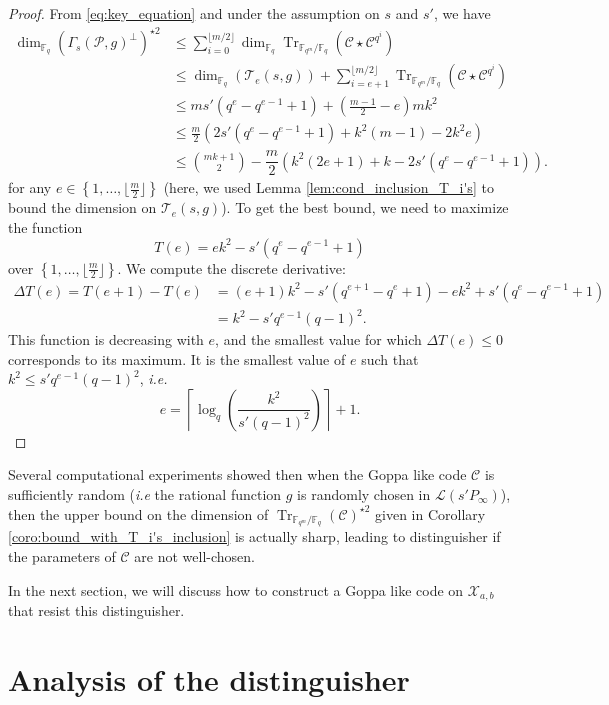 \documentclass[a4paper]{article}
\theoremstyle{definition}
\theoremstyle{remark}
\newcommand{\calP}{\mathcal{P}}
\newcommand{\calL}{\mathcal{L}}
\newcommand{\calC}{\mathcal{C}}
\newcommand{\calT}{\mathcal{T}}
\newcommand{\calX}{\mathcal{X}}
\newcommand{\fq}{\mathbb{F}_{q}}
\newcommand{\Tr}[1]{\operatorname{Tr}_{\mathbb{F}_{q^m}/\fq}\left(#1\right)}
\newcommand{\set}[1]{\left\{#1\right\}}
\begin{document}
\begin{proof}
    From \eqref{eq:key_equation} and under the assumption on $s$ and $s'$, we have
        \begin{align*}
        \dim_{\fq} (\Gamma_s(\calP,g)^{\perp})^{\star 2}
        & \leq \sum\limits_{i=0}^{\lfloor m/2 \rfloor} \dim_{\fq} \Tr{\calC \star \calC^{q^i}} \\
        & \leq \dim_{\fq} (\calT_e(s,g)) + \sum\limits_{i=e+1}^{\lfloor m/2 \rfloor} \Tr{\calC \star \calC^{q^i}} \\
        & \leq ms'(q^e-q^{e-1}+1) + \left( \frac{m-1}{2} -e \right)mk^2 \\
        & \leq \frac{m}{2}\left(2s'(q^e-q^{e-1}+1)+k^2(m-1)-2k^2e  \right) \\
        & \leq \binom{mk+1}{2} -  \dfrac{m}{2}\left(k^2(2e+1)+k-2s'(q^e-q^{e-1}+1)\right).
    \end{align*}
for any $e \in \set{1,\dots,\lfloor \frac{m}{2} \rfloor}$ (here, we used Lemma \ref{lem:cond_inclusion_T_i's} to bound the dimension on $\calT_e(s,g)$).
To get the best bound, we need to maximize the function
$$T(e) = ek^2-s'(q^e-q^{e-1}+1)$$
over $\set{1,\dots,\lfloor \frac{m}{2} \rfloor}$.
We compute the discrete derivative:
\begin{align*}
    \Delta T(e) = T(e+1)-T(e) &= (e+1)k^2- s'(q^{e+1}-q^e+1) - ek^2 + s'(q^e-q^{e-1}+1) \\
                              &= k^2 - s'q^{e-1}(q-1)^2.
\end{align*}
This function is decreasing with $e$, and the smallest value for which $\Delta T(e) \leq 0$ corresponds to its maximum. It is the smallest value of $e$ such that $k^2 \leq s'q^{e-1}(q-1)^2$, \emph{i.e.}
$$e =  \left\lceil \log_q\left(\dfrac{k^2}{s'(q-1)^2}\right)\right\rceil+1.$$
\end{proof}

\noindent Several computational experiments showed then when the Goppa like code $\calC$ is sufficiently random (\emph{i.e} the rational function $g$ is randomly chosen in $\calL(s'P_\infty)$), then the upper bound on the dimension of $\Tr{\calC}^{\star 2}$ given in Corollary \ref{coro:bound_with_T_i's_inclusion} is actually sharp, leading to  distinguisher if the parameters of $\calC$ are not well-chosen. 

In the next section, we will discuss how to construct a Goppa like code on $\calX_{a,b}$ that resist this distinguisher.

\section{Analysis of the distinguisher}
\end{document}
